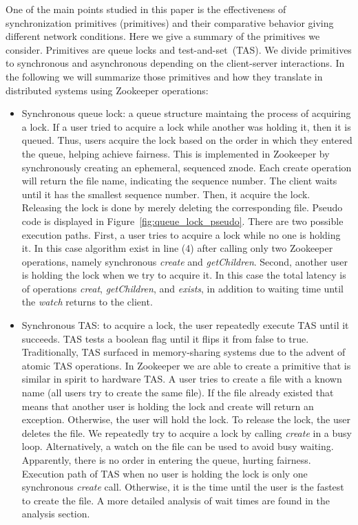 One of the main points studied in this paper is the effectiveness of synchronization primitives (primitives) and their comparative behavior giving different network conditions. Here we give a summary of the primitives we consider. Primitives are queue locks and test-and-set~(TAS). We divide primitives to synchronous and asynchronous depending on the client-server interactions. In the following we will summarize those primitives and how they translate in distributed systems using Zookeeper operations:
\begin{itemize}
\item{Synchronous queue lock: a queue structure maintaing the process of acquiring a lock. If a user tried to acquire a lock while another was holding it, then it is queued. Thus, users acquire the lock based on the order in which they entered the queue, helping achieve fairness. This is implemented in Zookeeper by synchronously creating an ephemeral, sequenced znode. Each create operation will return the file name, indicating the sequence number. The client waits until it has the smallest sequence number. Then, it acquire the lock. Releasing the lock is done by merely deleting the corresponding file. Pseudo code is displayed in Figure~\ref{fig:queue_lock_pseudo}. There are two possible execution paths. First, a user tries to acquire a lock while no one is holding it. In this case algorithm exist in line (4) after calling only two Zookeeper operations, namely synchronous \emph{create} and \emph{getChildren}. Second, another user is holding the lock when we try to acquire it. In this case the total latency is of operations \emph{creat}, \emph{getChildren}, and \emph{exists}, in addition to waiting time until the \emph{watch} returns to the client.}
\item{Synchronous TAS: to acquire a lock, the user repeatedly execute TAS until it succeeds. TAS tests a boolean flag until it flips it from false to true. Traditionally, TAS surfaced in memory-sharing systems due to the advent of atomic TAS operations. In Zookeeper we are able to create a primitive that is similar in spirit to hardware TAS. A user tries to create a file with a known name (all users try to create the same file). If the file already existed that means that another user is holding the lock and create will return an exception. Otherwise, the user will hold the lock. To release the lock, the user deletes the file. We repeatedly try to acquire a lock by calling \emph{create} in a busy loop. Alternatively, a watch on the file can be used to avoid busy waiting. Apparently, there is no order in entering the queue, hurting fairness. Execution path of TAS when no user is holding the lock is only one synchronous \emph{create} call. Otherwise, it is the time until the user is the fastest to create the file. A more detailed analysis of wait times are found in the analysis section. }

\end{itemize}
